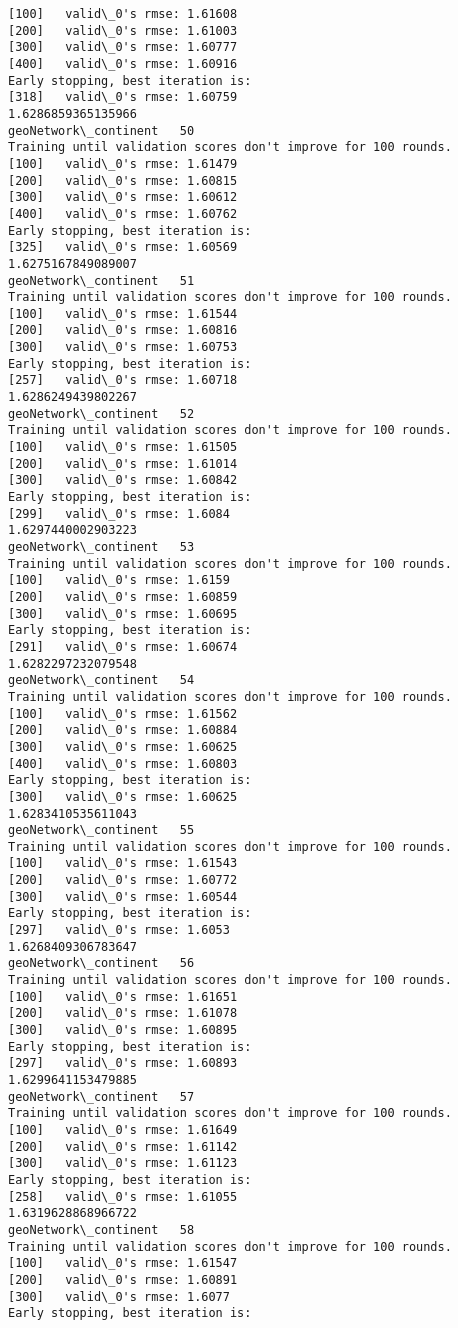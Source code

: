 \documentclass[11pt]{article}
\begin{document}
\begin{Verbatim}[commandchars=\\\{\}]
[100]	valid\_0's rmse: 1.61608
[200]	valid\_0's rmse: 1.61003
[300]	valid\_0's rmse: 1.60777
[400]	valid\_0's rmse: 1.60916
Early stopping, best iteration is:
[318]	valid\_0's rmse: 1.60759
1.6286859365135966
geoNetwork\_continent   50
Training until validation scores don't improve for 100 rounds.
[100]	valid\_0's rmse: 1.61479
[200]	valid\_0's rmse: 1.60815
[300]	valid\_0's rmse: 1.60612
[400]	valid\_0's rmse: 1.60762
Early stopping, best iteration is:
[325]	valid\_0's rmse: 1.60569
1.6275167849089007
geoNetwork\_continent   51
Training until validation scores don't improve for 100 rounds.
[100]	valid\_0's rmse: 1.61544
[200]	valid\_0's rmse: 1.60816
[300]	valid\_0's rmse: 1.60753
Early stopping, best iteration is:
[257]	valid\_0's rmse: 1.60718
1.6286249439802267
geoNetwork\_continent   52
Training until validation scores don't improve for 100 rounds.
[100]	valid\_0's rmse: 1.61505
[200]	valid\_0's rmse: 1.61014
[300]	valid\_0's rmse: 1.60842
Early stopping, best iteration is:
[299]	valid\_0's rmse: 1.6084
1.6297440002903223
geoNetwork\_continent   53
Training until validation scores don't improve for 100 rounds.
[100]	valid\_0's rmse: 1.6159
[200]	valid\_0's rmse: 1.60859
[300]	valid\_0's rmse: 1.60695
Early stopping, best iteration is:
[291]	valid\_0's rmse: 1.60674
1.6282297232079548
geoNetwork\_continent   54
Training until validation scores don't improve for 100 rounds.
[100]	valid\_0's rmse: 1.61562
[200]	valid\_0's rmse: 1.60884
[300]	valid\_0's rmse: 1.60625
[400]	valid\_0's rmse: 1.60803
Early stopping, best iteration is:
[300]	valid\_0's rmse: 1.60625
1.6283410535611043
geoNetwork\_continent   55
Training until validation scores don't improve for 100 rounds.
[100]	valid\_0's rmse: 1.61543
[200]	valid\_0's rmse: 1.60772
[300]	valid\_0's rmse: 1.60544
Early stopping, best iteration is:
[297]	valid\_0's rmse: 1.6053
1.6268409306783647
geoNetwork\_continent   56
Training until validation scores don't improve for 100 rounds.
[100]	valid\_0's rmse: 1.61651
[200]	valid\_0's rmse: 1.61078
[300]	valid\_0's rmse: 1.60895
Early stopping, best iteration is:
[297]	valid\_0's rmse: 1.60893
1.6299641153479885
geoNetwork\_continent   57
Training until validation scores don't improve for 100 rounds.
[100]	valid\_0's rmse: 1.61649
[200]	valid\_0's rmse: 1.61142
[300]	valid\_0's rmse: 1.61123
Early stopping, best iteration is:
[258]	valid\_0's rmse: 1.61055
1.6319628868966722
geoNetwork\_continent   58
Training until validation scores don't improve for 100 rounds.
[100]	valid\_0's rmse: 1.61547
[200]	valid\_0's rmse: 1.60891
[300]	valid\_0's rmse: 1.6077
Early stopping, best iteration is:

\end{Verbatim}
\end{document}
